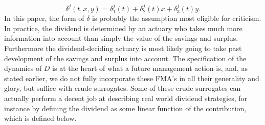 \documentclass[12pt]{article}
\theoremstyle{my_thm}
\begin{document}
\begin{equation*}
\delta^j(t,x,y)=\delta_1^j(t)+\delta_2^j(t)x+\delta_3^j(t)y.
\end{equation*}
In this paper, the form of $\delta$ is probably the assumption most eligible for criticism. In practice, the dividend is determined by an actuary who takes much more information into account than simply the value of the savings and surplus. Furthermore the dividend-deciding actuary is most likely going to take past development of the savings and surplus into account. The specification of the dynamics of $D$ is at the heart of what a future management action is, and, as stated earlier, we do not fully incorporate these FMA's in all their generality and glory, but suffice with crude surrogates. Some of these crude surrogates can actually perform a decent job at describing real world dividend strategies, for instance by defining the dividend as some linear function of the contribution, which is defined below.









\end{document}
